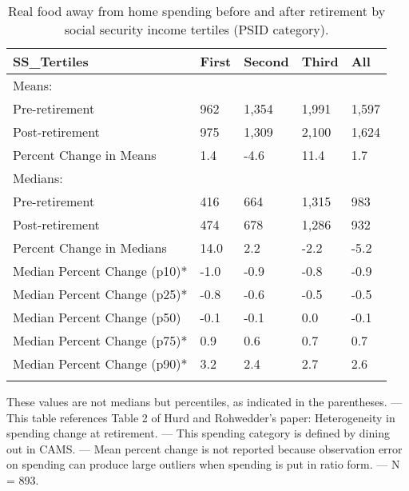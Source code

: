 \begin{table}[tbp] \centering
{}

\caption{Real food away from home spending before and after retirement by social security income tertiles (PSID category).}
\begin{tabularx}{\textwidth}{lCCCC}

\toprule
{SS\_Tertiles}&{First}&{Second}&{Third}&{All} \tabularnewline
\midrule\addlinespace[1.5ex]
Means:&&&& \tabularnewline
\midrule Pre-retirement&962&1,354&1,991&1,597 \tabularnewline
Post-retirement&975&1,309&2,100&1,624 \tabularnewline
Percent Change in Means&1.4&-4.6&11.4&1.7 \tabularnewline
\midrule Medians:&&&& \tabularnewline
\midrule Pre-retirement&416&664&1,315&983 \tabularnewline
Post-retirement&474&678&1,286&932 \tabularnewline
Percent Change in Medians&14.0&2.2&-2.2&-5.2 \tabularnewline
Median Percent Change (p10)*&-1.0&-0.9&-0.8&-0.9 \tabularnewline
Median Percent Change (p25)*&-0.8&-0.6&-0.5&-0.5 \tabularnewline
Median Percent Change (p50)&-0.1&-0.1&0.0&-0.1 \tabularnewline
Median Percent Change (p75)*&0.9&0.6&0.7&0.7 \tabularnewline
Median Percent Change (p90)*&3.2&2.4&2.7&2.6 \tabularnewline
\bottomrule \addlinespace[1.5ex]

\end{tabularx}
\begin{flushleft}
\footnotesize *These values are not medians but percentiles, as indicated in the parentheses. \linebreak --- \linebreak This table references Table 2 of Hurd and Rohwedder's paper: Heterogeneity in spending change at retirement. \linebreak --- \linebreak This spending category is defined by dining out in CAMS. \linebreak --- \linebreak Mean percent change is not reported because observation error on spending can produce large outliers when spending is put in ratio form. \linebreak --- \linebreak N = 893.
\end{flushleft}
\end{table}
